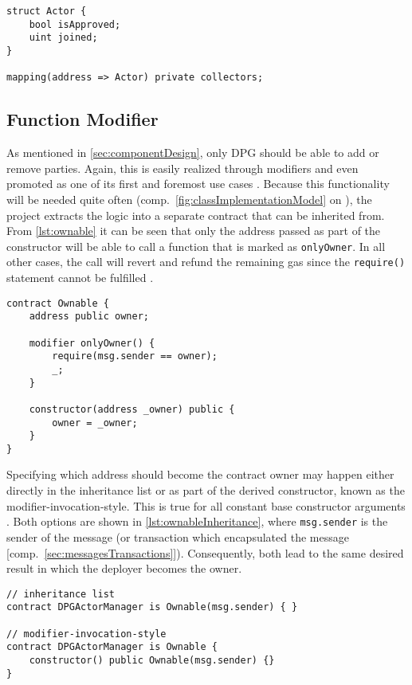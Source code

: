 \begin{lstlisting}[language=Solidity, caption=Declaration of approved agencies and Actor data structure, label=lst:actorStorage]
struct Actor {
	bool isApproved;
	uint joined;
}
    
mapping(address => Actor) private collectors;
\end{lstlisting}

\subsection{Function Modifier}
\label{sec:ownable}
As mentioned in \autoref{sec:componentDesign}, only \ac{DPG} should be able to add or remove parties. Again, this is easily realized through modifiers and even promoted as one of its first and foremost use cases \cite[p.~80]{solidityDocs}. Because this functionality will be needed quite often (comp.~\autoref{fig:classImplementationModel} on ), the project extracts the logic into a separate contract that can be inherited from. From \autoref{lst:ownable} it can be seen that only the address passed as part of the constructor will be able to call a function that is marked as \texttt{onlyOwner}. In all other cases, the call will revert and refund the remaining gas since the \texttt{require()} statement cannot be fulfilled \cite[p.~75]{solidityDocs}. 

\begin{lstlisting}[language=Solidity, caption=Ownable contract, label=lst:ownable]
contract Ownable {
	address public owner;
	
	modifier onlyOwner() {
		require(msg.sender == owner);
		_;
	}
	
	constructor(address _owner) public {
		owner = _owner;
	}
}
\end{lstlisting}

Specifying which address should become the contract owner may happen either directly in the inheritance list or as part of the derived constructor, known as the modifier-invocation-style. This is true for all constant base constructor arguments \cite[p.~89]{solidityDocs}. Both options are shown in \autoref{lst:ownableInheritance}, where \texttt{msg.sender} is the sender of the message (or transaction which encapsulated the message [comp.~\ref{sec:messagesTransactions}]). Consequently, both lead to the same desired result in which the deployer becomes the owner.

\begin{lstlisting}[language=Solidity, caption=Inheriting from Ownable contract, label=lst:ownableInheritance]
// inheritance list
contract DPGActorManager is Ownable(msg.sender) { }

// modifier-invocation-style
contract DPGActorManager is Ownable { 
	constructor() public Ownable(msg.sender) {}
}
\end{lstlisting}

